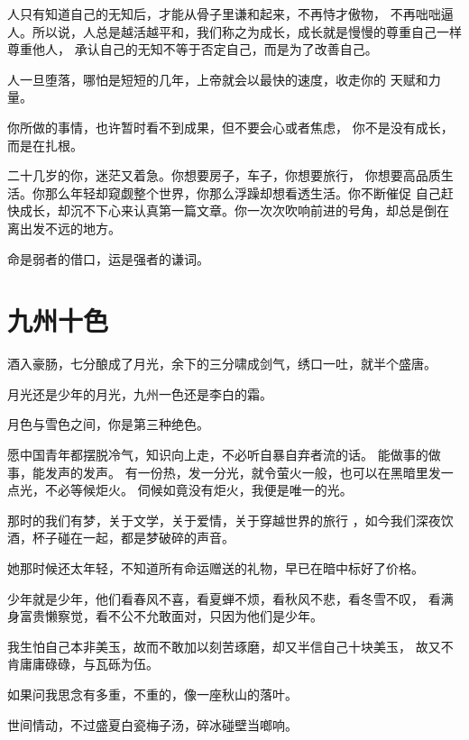 \documentclass[UTF8,oneside]{ctexbook}
\begin{document}
\mfApache \quad 人只有知道自己的无知后，才能从骨子里谦和起来，不再恃才傲物，
不再咄咄逼人。所以说，人总是越活越平和，我们称之为成长，成长就是慢慢的尊重自己一样尊重他人，
承认自己的无知不等于否定自己，而是为了改善自己。

\mfApache \quad 人一旦堕落，哪怕是短短的几年，上帝就会以最快的速度，收走你的
天赋和力量。

\mfApache \quad 你所做的事情，也许暂时看不到成果，但不要会心或者焦虑，
你不是没有成长，而是在扎根。

\mfApache \quad 二十几岁的你，迷茫又着急。你想要房子，车子，你想要旅行，
你想要高品质生活。你那么年轻却窥觑整个世界，你那么浮躁却想看透生活。你不断催促
自己赶快成长，却沉不下心来认真第一篇文章。你一次次吹响前进的号角，却总是倒在
离出发不远的地方。

\mfApache \quad 命是弱者的借口，运是强者的谦词。

\mfApache \quad 

\section{九州十色}
\mfApache \quad 酒入豪肠，七分酿成了月光，余下的三分啸成剑气，绣口一吐，就半个盛唐。

\mfApache \quad 月光还是少年的月光，九州一色还是李白的霜。

\mfApache \quad 月色与雪色之间，你是第三种绝色。

\mfApache \quad 愿中国青年都摆脱冷气，知识向上走，不必听自暴自弃者流的话。
能做事的做事，能发声的发声。
有一份热，发一分光，就令萤火一般，也可以在黑暗里发一点光，不必等候炬火。
伺候如竟没有炬火，我便是唯一的光。

\mfApache \quad 那时的我们有梦，关于文学，关于爱情，关于穿越世界的旅行
，如今我们深夜饮酒，杯子碰在一起，都是梦破碎的声音。

\mfApache \quad 她那时候还太年轻，不知道所有命运赠送的礼物，早已在暗中标好了价格。

\mfApache \quad 少年就是少年，他们看春风不喜，看夏蝉不烦，看秋风不悲，看冬雪不叹，
看满身富贵懒察觉，看不公不允敢面对，只因为他们是少年。

\mfApache \quad 我生怕自己本非美玉，故而不敢加以刻苦琢磨，却又半信自己十块美玉，
故又不肯庸庸碌碌，与瓦砾为伍。

\mfApache \quad 如果问我思念有多重，不重的，像一座秋山的落叶。

\mfApache \quad 世间情动，不过盛夏白瓷梅子汤，碎冰碰壁当啷响。

\mfApache \quad 
\end{document}
